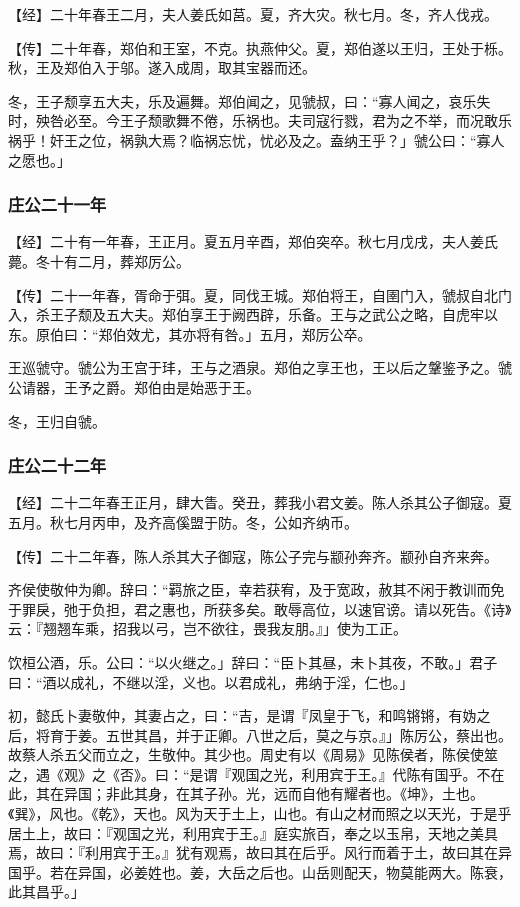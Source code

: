 \documentclass[]{article}
\begin{document}
【经】二十年春王二月，夫人姜氏如莒。夏，齐大灾。秋七月。冬，齐人伐戎。

【传】二十年春，郑伯和王室，不克。执燕仲父。夏，郑伯遂以王归，王处于栎。秋，王及郑伯入于邬。遂入成周，取其宝器而还。

冬，王子颓享五大夫，乐及遍舞。郑伯闻之，见虢叔，曰：``寡人闻之，哀乐失时，殃咎必至。今王子颓歌舞不倦，乐祸也。夫司寇行戮，君为之不举，而况敢乐祸乎！奸王之位，祸孰大焉？临祸忘忧，忧必及之。盍纳王乎？」虢公曰：``寡人之愿也。」

\hypertarget{header-n511}{%
\subsubsection{庄公二十一年}\label{header-n511}}

【经】二十有一年春，王正月。夏五月辛酉，郑伯突卒。秋七月戊戌，夫人姜氏薨。冬十有二月，葬郑厉公。

【传】二十一年春，胥命于弭。夏，同伐王城。郑伯将王，自圉门入，虢叔自北门入，杀王子颓及五大夫。郑伯享王于阙西辟，乐备。王与之武公之略，自虎牢以东。原伯曰：``郑伯效尤，其亦将有咎。」五月，郑厉公卒。

王巡虢守。虢公为王宫于玤，王与之酒泉。郑伯之享王也，王以后之鞶鉴予之。虢公请器，王予之爵。郑伯由是始恶于王。

冬，王归自虢。

\hypertarget{header-n518}{%
\subsubsection{庄公二十二年}\label{header-n518}}

【经】二十二年春王正月，肆大眚。癸丑，葬我小君文姜。陈人杀其公子御寇。夏五月。秋七月丙申，及齐高傒盟于防。冬，公如齐纳币。

【传】二十二年春，陈人杀其大子御寇，陈公子完与颛孙奔齐。颛孙自齐来奔。

齐侯使敬仲为卿。辞曰：``羁旅之臣，幸若获宥，及于宽政，赦其不闲于教训而免于罪戾，弛于负担，君之惠也，所获多矣。敢辱高位，以速官谤。请以死告。《诗》云：『翘翘车乘，招我以弓，岂不欲往，畏我友朋。』」使为工正。

饮桓公酒，乐。公曰：``以火继之。」辞曰：``臣卜其昼，未卜其夜，不敢。」君子曰：``酒以成礼，不继以淫，义也。以君成礼，弗纳于淫，仁也。」

初，懿氏卜妻敬仲，其妻占之，曰：``吉，是谓『凤皇于飞，和鸣锵锵，有妫之后，将育于姜。五世其昌，并于正卿。八世之后，莫之与京。』」陈厉公，蔡出也。故蔡人杀五父而立之，生敬仲。其少也。周史有以《周易》见陈侯者，陈侯使筮之，遇《观》之《否》。曰：``是谓『观国之光，利用宾于王。』代陈有国乎。不在此，其在异国；非此其身，在其子孙。光，远而自他有耀者也。《坤》，土也。《巽》，风也。《乾》，天也。风为天于土上，山也。有山之材而照之以天光，于是乎居土上，故曰：『观国之光，利用宾于王。』庭实旅百，奉之以玉帛，天地之美具焉，故曰：『利用宾于王。』犹有观焉，故曰其在后乎。风行而着于土，故曰其在异国乎。若在异国，必姜姓也。姜，大岳之后也。山岳则配天，物莫能两大。陈衰，此其昌乎。」
\end{document}
